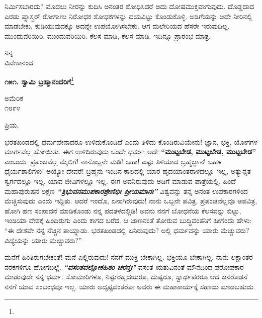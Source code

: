 ನಿರ್ಮಿಸಬಾರದು? ಮೊದಲು ನೀರನ್ನು ಕುದಿಸಿ ಅನಂತರ ಶೋಧಿಸಿದರೆ ಅದು ದೋಷಮುಕ್ತವಾಗುವುದು. ದೊಡ್ಡದಾದ ಎರಡು ಪ್ಯಾಸ್ಚರ್ ರೋಗಾಣು ನಿರೋಧಕ ಶೋಧಕಗಳನ್ನು ದಯವಿಟ್ಟು ಕೊಂಡುಕೊಳ್ಳಿ. ಅಡಿಗೆಯನ್ನು ಅದೇ ನೀರಿನಲ್ಲಿ ಮಾಡಬೇಕು, ಕುಡಿಯುವುದಕ್ಕೂ ಅದನ್ನೇ ಉಪಯೋಗಿಸಬೇಕು. ಆಗ ಮಲೇರಿಯದ ಹೆಸರೇ ಇರುವುದಿಲ್ಲ. ಮುಂದುವರಿಯಿರಿ, ಮುಂದುವರಿಯಿರಿ. ಕೆಲಸ ಮಾಡಿ, ಕೆಲಸ ಮಾಡಿ. ಇದಿನ್ನೂ ಪ್ರಾರಂಭ ಮಾತ್ರ.

\vspace{-0.5cm}

{\flushright
ನಿನ್ನ\\ವಿವೇಕಾನಂದ\par}

\begin{center}
\textbf{೧೫೧. ಸ್ವಾಮಿ ಬ್ರಹ್ಮಾನಂದರಿಗೆ}\footnote{}
\end{center}

\vspace{-0.5cm}

\begin{flushright}
ಅಮೆರಿಕ\\೧೮೯೪
\end{flushright}

\vspace{-0.5cm}

\noindent
ಪ್ರಿಯ,

ಭರತಖಂಡದಲ್ಲಿ ಧರ್ಮವೇನಾದರೂ ಉಳಿದುಕೊಂಡಿದೆ ಎಂದು ತಿಳಿದು ಕೊಂಡಿರುವಿಯೇನು! ಜ್ಞಾನ, ಭಕ್ತಿ, ಯೋಗಗಳ ಮಾರ್ಗವೆಲ್ಲ ಹೋಯಿತು. ಈಗ ಉಳಿದಿರುವುದು ಒಂದೇ ಧರ್ಮ: ಅದೇ \textbf{“ಮುಟ್ಟಬೇಡ, ಮುಟ್ಟಬೇಡ, ಮುಟ್ಟಬೇಡ”} ಎಂಬುದು. ಪ್ರಪಂಚವೆಲ್ಲ ಮೈಲಿಗೆ! ನಾನೊಬ್ಬನೇ ಮಡಿ! ಆಹಾ! ಎಷ್ಟು ತಿಳಿಯಾದ ಬ್ರಹ್ಮಜ್ಞಾನ! ಬಹಳ ಧೈರ್ಯಶಾಲಿಗಳು! ಅಯ್ಯೋ ದೇವರೆ! ಬ್ರಹ್ಮನು ಇಂದಿನ ಕಾಲದಲ್ಲಿ ಯಾರ ಹೃದಯಾಂತರಾಳದಲ್ಲೂ ಇಲ್ಲ, ಅತ್ಯುನ್ನತ ಸ್ವರ್ಗದಲ್ಲೂ ಇಲ್ಲ, ಯಾವ ಜೀವಿಗಳಲ್ಲೂ ಇಲ್ಲ. ಈಗ ಅವನಿರುವುದು ಅಡಿಗೆ ಮಾಡುವ ಪಾತ್ರೆಯಲ್ಲಿ. ಹಿಂದೆ ಮಹಾಪುರುಷನ ಲಕ್ಷಣ \textbf{\textit{“ತ್ರಿಭುವನಮುಪಕಾರಶ್ರೇಣಿಭಿಃ ಪ್ರೀಯಮಾನಃ”}} ವಿಶ್ವವನ್ನು ತನ್ನ ಅನಂತ ಉಪಕಾರಗಳಿಂದ ಮೆಚ್ಚಿಸುವುದು\enginline{-} ಎಂದು ಇದ್ದಿತು. ಆದರೆ ಇಂದೊ, ಏನಾಗಿರುವುದು! ನಾನು ಒಬ್ಬನೇ ಪವಿತ್ರ, ಪ್ರಪಂಚವೆಲ್ಲವೂ ಅಪವಿತ್ರ, ಹೋಗಿ ಹಣ ಸಂಪಾದನೆ ಮಾಡಿಕೊಂಡು ನನ್ನ ಪದತಳದಲ್ಲಿಡಿ!\enginline{-} ಅವನು ನನಗೆ ಬೋಧನೆಯ ಕೆಲಸವನ್ನು ಬಿಟ್ಟು, ಇಂಡಿಯಾ ದೇಶಕ್ಕೆ ಹಿಂದಿರುಗು ಎಂದು ಕಾಗದ ಬರೆದ. ಆ ಜಾಣನಂತೆ ತೋರುವ ಬುದ್ಧಿವಂತನಿಗೆ ಹೀಗೆಂದು ಹೇಳು: “ಈ ದೇಶವೇ ನನ್ನ ನೆಚ್ಚಿನ ತಾಯ್ನಾಡು. ಭರತಖಂಡದಲ್ಲಿ ಏನಿರುವುದು? ಅಲ್ಲಿ ಧರ್ಮವನ್ನು ಯಾರು ಮೆಚ್ಚುವರು? ವಿದ್ಯೆಯನ್ನು ಯಾರು ಮೆಚ್ಚುವರು?”

ಮನೆಗೆ ಹಿಂತಿರುಗಬೇಕಂತೆ! ಮನೆ ಎಲ್ಲಿರುವುದು! ನನಗೆ ಮುಕ್ತಿ ಬೇಕಾಗಿಲ್ಲ. ಭಕ್ತಿಯೂ ಬೇಕಾಗಿಲ್ಲ. ನಾನು ಲಕ್ಷಾಂತರ ನರಕಗಳಿಗೂ ಹೋಗಬಲ್ಲೆ. \textbf{\textit{ “ವಸಂತವಲ್ಲೋಕಹಿತಂ ಚರನ್ತಃ"}} \enginline{-} ವಸಂತ ಋತುವಿನಂತೆ ಮೌನದಿಂದ ಪರೋಪಕಾರ ಮಾಡುವುದೇ ನನ್ನ ಧರ್ಮ. ಸೋಮಾರಿಗಳೂ, ನಿಷ್ಟುರಹೃದಯರೂ, ದುಷ್ಟರೂ, ಸ್ವಾರ್ಥಪರರೂ ಆದ ಜನರೊಡನೆ ನನಗೆ ಯಾವ ಸಂಬಂಧವೂ ಇಲ್ಲ. ಯಾರು ಅದೃಷ್ಟವಂತರೋ ಅವರು ಈ ಮಹಾಕಾರ್ಯಕ್ಕೆ ಸಹಾಯ ಮಾಡಬಹುದು.

